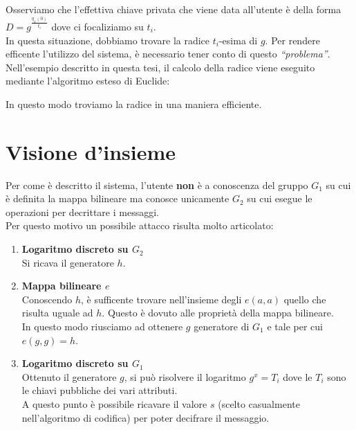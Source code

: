 Osserviamo che l'effettiva chiave privata che viene data all'utente è della forma $D = g^{\frac{q_x(0)}{t_i}}$ dove ci focaliziamo su $t_i$.\\
In questa situazione, dobbiamo trovare la radice $t_i$-esima di $g$. Per rendere efficente l'utilizzo del sistema, è necessario tener conto di questo \emph{``problema''}.\\
Nell'esempio descritto in questa tesi, il calcolo della radice viene eseguito mediante l'algoritmo esteso di Euclide:

\begin{center}
\end{center}

In questo modo troviamo la radice in una maniera efficiente.



\section{Visione d'insieme}


Per come è descritto il sistema, l'utente \textbf{non} è a conoscenza del gruppo $G_1$ su cui è definita la mappa bilineare ma conosce unicamente $G_2$ su cui esegue le operazioni per decrittare i messaggi.\\
Per questo motivo un possibile attacco risulta molto articolato:\label{security}
\begin{enumerate}
   \item\textbf{ Logaritmo discreto su $G_2$}\\
   Si ricava il generatore $h$.
   \item \textbf{Mappa bilineare $e$}\\
   Conoscendo $h$, è sufficente trovare nell'insieme degli $e(a,a)$ quello che risulta uguale ad $h$. Questo è dovuto alle proprietà della mappa bilineare.\\
   In questo modo riusciamo ad ottenere $g$ generatore di $G_1$ e tale per cui $e(g,g) = h$.
   \item\textbf{ Logaritmo discreto su $G_1$}\\
   Ottenuto il generatore $g$, si può risolvere il logaritmo $g^x = T_i$ dove le $T_i$ sono le chiavi pubbliche dei vari attributi.\\
   A questo punto è possibile ricavare il valore $s$ (scelto casualmente nell'algoritmo di codifica) per poter decifrare il messaggio.
\end{enumerate}

